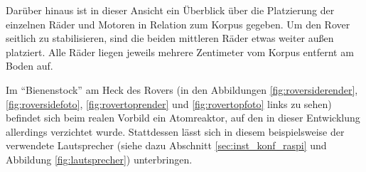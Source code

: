 Darüber hinaus ist in dieser Ansicht ein Überblick über die Platzierung der einzelnen Räder und Motoren in Relation zum Korpus gegeben.
Um den Rover seitlich zu stabilisieren, sind die beiden mittleren Räder etwas weiter außen platziert.
Alle Räder liegen jeweils mehrere Zentimeter vom Korpus entfernt am Boden auf.

Im \enquote{Bienenstock} am Heck des Rovers (in den Abbildungen \ref{fig:roversiderender}, \ref{fig:roversidefoto}, \ref{fig:rovertoprender} und \ref{fig:rovertopfoto} links zu sehen) befindet sich beim realen Vorbild ein Atomreaktor, auf den in dieser Entwicklung allerdings verzichtet wurde.
Stattdessen lässt sich in diesem beispielsweise der verwendete Lautsprecher (siehe dazu Abschnitt \ref{sec:inst_konf_raspi} und Abbildung \ref{fig:lautsprecher}) unterbringen. 